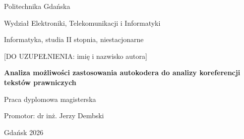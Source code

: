 \begin{titlepage}
  \centering
  {\large Politechnika Gdańska\par}
  {\large Wydział Elektroniki, Telekomunikacji i Informatyki\par}
  \vspace{1.5cm}
  {\large Informatyka, studia II stopnia, niestacjonarne\par}
  \vfill
  {\Large [DO UZUPEŁNIENIA: imię i nazwisko autora]\par}
  \vspace{1cm}
  {\LARGE\bfseries Analiza możliwości zastosowania autokodera do analizy koreferencji tekstów prawniczych\par}
  \vspace{0.7cm}
  {\large Praca dyplomowa magisterska\par}
  \vfill
  \begin{flushright}
    Promotor: dr inż. Jerzy Dembski
  \end{flushright}
  \vfill
  {Gdańsk 2026\par}
\end{titlepage}
